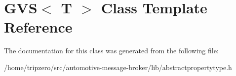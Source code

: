 \hypertarget{classGVS}{\section{G\-V\-S$<$ T $>$ Class Template Reference}
\label{classGVS}
}


The documentation for this class was generated from the following file\-:\begin{DoxyCompactItemize}
\item 
/home/tripzero/src/automotive-\/message-\/broker/lib/abstractpropertytype.\-h\end{DoxyCompactItemize}
